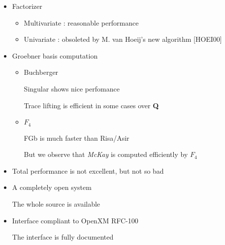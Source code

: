 \begin{slide}{}

\begin{itemize}
\item Factorizer

\begin{itemize}
\item Multivariate : reasonable performance

\item Univariate : obsoleted by M. van Hoeij's new algorithm [HOEI00]
\end{itemize}

\item Groebner basis computation

\begin{itemize}
\item Buchberger

Singular shows nice perfomance

Trace lifting is efficient in some cases over {\bf Q}

\item $F_4$

FGb is much faster than Risa/Asir

But we observe that {\it McKay} is computed efficiently by $F_4$
\end{itemize}
\end{itemize}

\end{slide}

\begin{slide}{}

\begin{itemize}
\item Total performance is not excellent, but not so bad

\item A completely open system

The whole source is available

\item Interface compliant to OpenXM RFC-100

The interface is fully documented
\end{itemize}

\end{slide}


